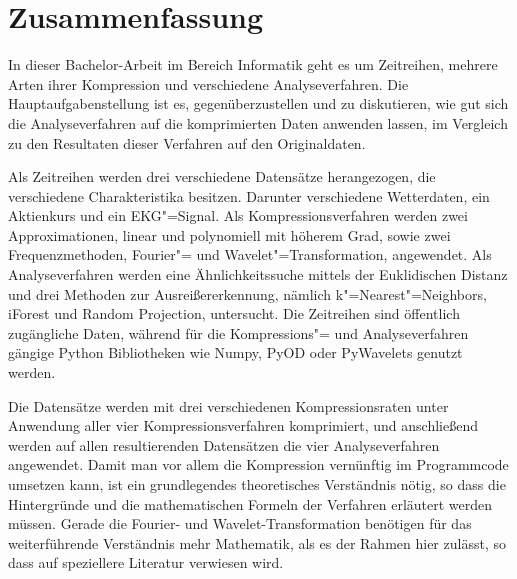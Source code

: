 \chapter*{Zusammenfassung}
In dieser Bachelor-Arbeit im Bereich Informatik geht es um Zeitreihen, mehrere Arten ihrer Kompression und verschiedene Analyseverfahren. Die Hauptaufgabenstellung ist es,
gegenüberzustellen und zu diskutieren, wie gut sich die Analyseverfahren auf die komprimierten Daten anwenden lassen, im Vergleich zu den Resultaten dieser Verfahren auf den
Originaldaten.

Als Zeitreihen werden drei verschiedene Datensätze herangezogen, die verschiedene Charakteristika besitzen. Darunter verschiedene Wetterdaten, ein Aktienkurs und ein EKG"=Signal. Als Kompressionsverfahren werden zwei Approximationen, linear und polynomiell mit höherem Grad, sowie zwei Frequenzmethoden, Fourier"= und Wavelet"=Transformation, angewendet. Als Analyseverfahren werden eine Ähnlichkeitssuche mittels der Euklidischen Distanz und drei Methoden zur Ausreißererkennung, nämlich k"=Nearest"=Neighbors, iForest und Random Projection, untersucht. Die Zeitreihen sind öffentlich zugängliche Daten, während für die Kompressions"= und Analyseverfahren gängige Python Bibliotheken wie Numpy, PyOD oder PyWavelets genutzt werden.

Die Datensätze werden mit drei verschiedenen Kompressionsraten unter Anwendung aller vier Kompressionsverfahren komprimiert, und anschließend werden auf allen resultierenden Datensätzen die vier Analyseverfahren angewendet. Damit man vor allem die Kompression vernünftig im Programmcode umsetzen kann, ist ein grundlegendes theoretisches Verständnis nötig, so dass die Hintergründe und die mathematischen Formeln der Verfahren erläutert werden müssen. Gerade die Fourier- und Wavelet-Transformation benötigen für das weiterführende Verständnis mehr Mathematik, als es der Rahmen hier zulässt, so dass auf speziellere Literatur verwiesen wird.

